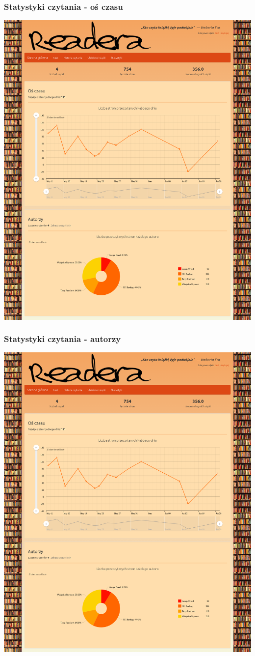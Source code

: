 \documentclass{beamer}
\begin{document}
    \begin{frame}
        \frametitle{Statystyki czytania - oś czasu}
        \includegraphics[width=\textwidth, trim=0 640 0 0, clip]{stats.png}
    \end{frame}
    \begin{frame}
        \frametitle{Statystyki czytania - autorzy}
        \includegraphics[width=\textwidth, trim=0 0 0 1000, clip]{stats.png}
    \end{frame}
\end{document}
